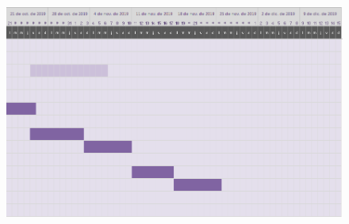 \documentclass[12pt]{article}
\begin{document}
\begin{figure}[H]
	\begin{Center}
		\includegraphics[width=7.18in,height=4.52in]{./media/image3.png}
	\end{Center}
\end{figure}




\par


\vspace{\baselineskip}

\vspace{\baselineskip}

\vspace{\baselineskip}

\vspace{\baselineskip}

\vspace{\baselineskip}

\vspace{\baselineskip}

\vspace{\baselineskip}

\vspace{\baselineskip}

\vspace{\baselineskip}

\vspace{\baselineskip}

\vspace{\baselineskip}
\end{document}
